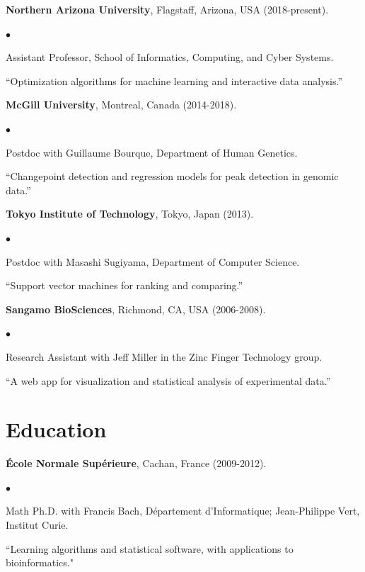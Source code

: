 \documentclass[margin,line]{res}
\newenvironment{list2}{
  \begin{list}{$\bullet$}{%
      \setlength{\itemsep}{0in}
      \setlength{\parsep}{0in} \setlength{\parskip}{0in}
      \setlength{\topsep}{0in} \setlength{\partopsep}{0in} 
      \setlength{\leftmargin}{0.2in}}}{\end{list}}
\begin{document}
\begin{resume}
{\bf Northern Arizona University}, Flagstaff, Arizona, USA (2018-present).\\
\vspace*{-.1in}
\begin{list2}
\item[] Assistant Professor, School of Informatics, Computing, and Cyber Systems.
\item[] ``Optimization algorithms for machine learning and interactive data analysis.''
\end{list2}

{\bf McGill University}, Montreal, Canada (2014-2018).\\
\vspace*{-.1in}
\begin{list2}
\item[] Postdoc with Guillaume Bourque, Department of Human Genetics.
\item[]``Changepoint detection and regression models for peak detection in genomic data.''
\end{list2}

{\bf Tokyo Institute of Technology}, Tokyo, Japan (2013).\\
\vspace*{-.1in}
\begin{list2}
\item[] Postdoc with Masashi Sugiyama, Department of Computer Science.
\item[] ``Support vector machines for ranking and comparing.''
\end{list2}

{\bf Sangamo BioSciences}, Richmond, CA, USA (2006-2008).\\
\vspace*{-.1in}
\begin{list2}
\item[] Research Assistant with Jeff Miller in the Zinc Finger Technology group.
\item[] ``A web app for visualization and statistical analysis of experimental data.''
\end{list2}

\section{\sc Education}

{\bf \'{E}cole Normale Sup\'{e}rieure}, Cachan, France (2009-2012).\\
\vspace*{-.1in}
\begin{list2}
\item[] Math Ph.D. with Francis Bach, D\'{e}partement d'Informatique; Jean-Philippe Vert, Institut Curie.
\item[] ``Learning algorithms and statistical software, with applications to bioinformatics."
\end{list2}


\end{resume}
\end{document}
